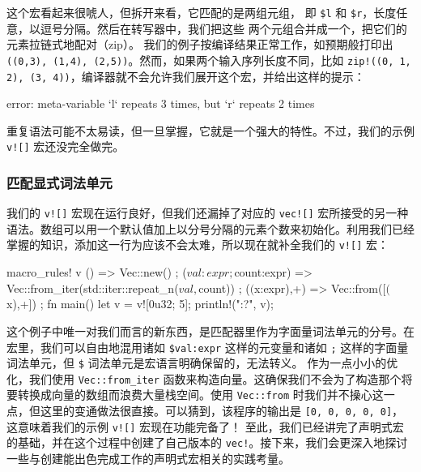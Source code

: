 这个宏看起来很唬人，但拆开来看，它匹配的是两组元组，
即 \texttt{\$l} 和 \texttt{\$r}，长度任意，以逗号分隔。然后在转写器中，我们把这些
两个元组合并成一个，把它们的元素拉链式地配对（zip）。
\label{idx:idx_3955ed8f}
我们的例子按编译结果正常工作，如预期般打印出 \texttt{(\allowbreak{}(\allowbreak{}0,\allowbreak{}3)\allowbreak{},\allowbreak{} (\allowbreak{}1,\allowbreak{}4)\allowbreak{},\allowbreak{} (\allowbreak{}2,\allowbreak{}5)\allowbreak{})\allowbreak{}}。然而，如果两个输入序列长度不同，比如 \texttt{zip!(\allowbreak{}(\allowbreak{}0,\allowbreak{} 1,\allowbreak{} 2)\allowbreak{},\allowbreak{} (\allowbreak{}3,\allowbreak{} 4)\allowbreak{})\allowbreak{}}，编译器就不会允许我们展开这个宏，并给出这样的提示：
\begin{codeboxdark}
error: meta-variable `l` repeats 3 times, but `r` repeats 2 times
\end{codeboxdark}
重复语法可能不太易读，但一旦掌握，它就是一个强大的特性。不过，我们的示例 \texttt{v![]} 宏还没完全做完。
\subsubsection{匹配显式词法单元}
\label{idx:idx_4b4584dd}
我们的 \texttt{v![]} 宏现在运行良好，但我们还漏掉了对应的 \texttt{vec![]} 宏所接受的另一种语法。数组可以用一个默认值加上以分号分隔的元素个数来初始化。利用我们已经掌握的知识，添加这一行为应该不会太难，所以现在就补全我们的 \texttt{v![]} 宏：
\begin{codebox}[rust]
macro_rules! v {
  () => { Vec::new() };
  ($val:expr; $count:expr) =>
    { Vec::from_iter(std::iter::repeat_n($val, $count)) };
  ($($x:expr),+) => { Vec::from([$($x),+]) };
}
fn main() {
  let v = v![0u32; 5];
  println!("{:?}", v);
}
\end{codebox}
这个例子中唯一对我们而言的新东西，是匹配器里作为字面量词法单元的分号。在宏里，我们可以自由地混用诸如 \texttt{\$val:expr} 这样的元变量和诸如 \texttt{;} 这样的字面量词法单元，但
\texttt{\$} 词法单元是宏语言明确保留的，无法转义。
\label{idx:idx_29426b12}
作为一点小小的优化，我们使用 \texttt{Vec::\allowbreak{}from\_\allowbreak{}iter} 函数来构造向量。这确保我们不会为了构造那个将要转换成向量的数组而浪费大量栈空间。使用 \texttt{Vec::from} 时我们并不操心这一点，但这里的变通做法很直接。可以猜到，该程序的输出是 \texttt{[\allowbreak{}0,\allowbreak{} 0,\allowbreak{} 0,\allowbreak{} 0,\allowbreak{} 0]\allowbreak{}}，这意味着我们的示例 \texttt{v![]} 宏现在功能完备了！
至此，我们已经讲完了声明式宏的基础，并在这个过程中创建了自己版本的 \texttt{vec!}。接下来，我们会更深入地探讨一些与创建能出色完成工作的声明式宏相关的实践考量。

